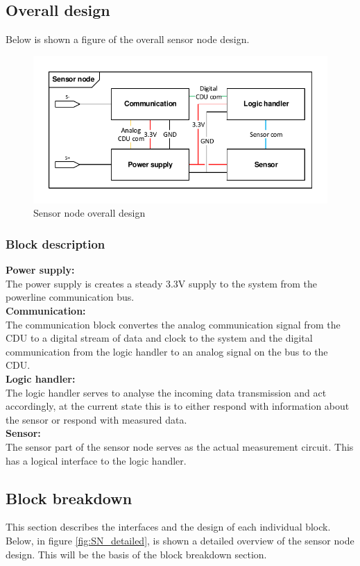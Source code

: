 \subsection{Overall design}
Below is shown a figure of the overall sensor node design.
\begin{figure}[H]
\centering
\includegraphics[width=.9\textwidth]{billeder/sn_overall_design}
\caption{Sensor node overall design}
\end{figure}

\subsubsection{Block description}
\textbf{Power supply:}\\
The power supply is creates a steady 3.3V supply to the system from the powerline communication bus.\\

\textbf{Communication:}\\
The communication block convertes the analog communication signal from the CDU to a digital stream of data and clock to the system and the digital communication from the logic handler to an analog signal on the bus to the CDU.\\

\textbf{Logic handler:}\\
The logic handler serves to analyse the incoming data transmission and act accordingly, at the current state this is to either respond with information about the sensor or respond with measured data.\\

\textbf{Sensor:}\\
The sensor part of the sensor node serves as the actual measurement circuit. This has a logical interface to the logic handler.\\

\subsection{Block breakdown}
This section describes the interfaces and the design of each individual block.\\
Below, in figure \ref{fig:SN_detailed}, is shown a detailed overview of the sensor node design. This will be the basis of the block breakdown section.

